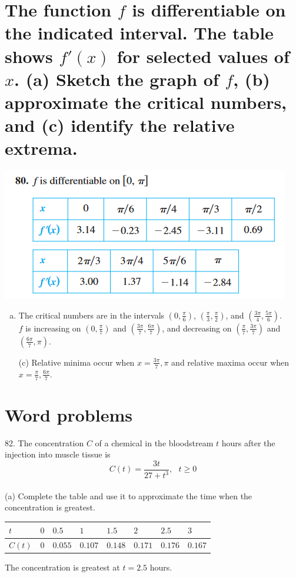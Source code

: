 \documentclass[11pt]{article}
\begin{document}
\section{The function $f$ is differentiable on the indicated interval. The table shows $f'(x)$ for selected values of $x$. (a) Sketch the graph of $f$, (b) approximate the critical numbers, and (c) identify the relative extrema.}
\includegraphics{80a.png}
\begin{enumerate}[(b)]
    \item The critical numbers are in the intervals $\left(0, \frac{\pi}{6}\right)$, $\left(\frac{\pi}{3}, \frac{\pi}{2}\right)$, and $\left(\frac{3\pi}{4}, \frac{5\pi}{6}\right)$.\\
        $f$ is increasing on $\left(0, \frac{\pi}{7}\right)$ and $\left(\frac{3\pi}{7}, \frac{6\pi}{7}\right)$, and decreasing on $\left(\frac{\pi}{7}, \frac{3\pi}{7}\right)$ and $\left(\frac{6\pi}{7}, \pi\right)$.
    \item[(c)] Relative minima occur when $x=\frac{3\pi}{7}, \pi$ and relative maxima occur when $x=\frac{\pi}{7}, \frac{6\pi}{7}$.
\end{enumerate}

\section{Word problems}
82. The concentration $C$ of a chemical in the bloodstream $t$ hours after the injection into muscle tissue is \[C(t)=\frac{3t}{27+t^3},\,\,\,\, t\geq 0\]\\
(a) Complete the table and use it to approximate the time when the concentration is greatest.
\begin{flushleft}
    \begin{table}[h]
            \begin{tabular}{|l|l|l|l|l|l|l|l|}
                \hline
                $t$ & $0$ & $0.5$ & $1$ & $1.5$ & $2$ & $2.5$ & $3$\\ \hline
                $C(t)$ & $0$ & $0.055$ & $0.107$ & $0.148$ & $0.171$ & $0.176$ & $0.167$\\ \hline
         \end{tabular}
    \end{table}
\end{flushleft}
The concentration is greatest at $t=2.5$ hours.\\
\end{document}
